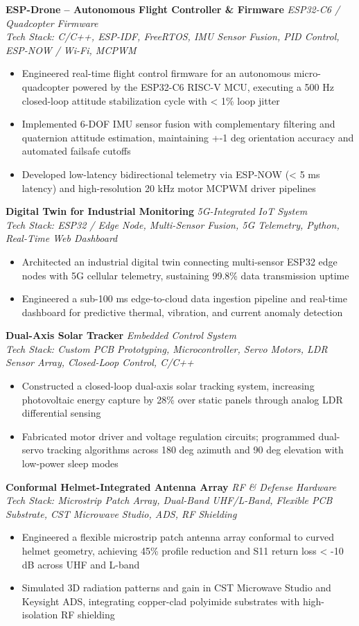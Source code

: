 \documentclass[a4paper,10pt]{article}
\newcommand{\resumeItem}[1]{\item #1}
\newenvironment{resumeItemize}{\begin{itemize}[leftmargin=*, itemsep=0.5pt, topsep=0.8pt]}{\end{itemize}}
\newcommand{\resumeProject}[3]{
  \textbf{#1} \hfill \textit{#2} \\
  \textit{Tech Stack: #3}
}
\begin{document}
\resumeProject{ESP-Drone -- Autonomous Flight Controller \& Firmware}{ESP32-C6 / Quadcopter Firmware}{C/C++, ESP-IDF, FreeRTOS, IMU Sensor Fusion, PID Control, ESP-NOW / Wi-Fi, MCPWM}
\begin{resumeItemize}
    \resumeItem{Engineered real-time flight control firmware for an autonomous micro-quadcopter powered by the ESP32-C6 RISC-V MCU, executing a 500 Hz closed-loop attitude stabilization cycle with < 1\% loop jitter}
    \resumeItem{Implemented 6-DOF IMU sensor fusion with complementary filtering and quaternion attitude estimation, maintaining +-1 deg orientation accuracy and automated failsafe cutoffs}
    \resumeItem{Developed low-latency bidirectional telemetry via ESP-NOW (< 5 ms latency) and high-resolution 20 kHz motor MCPWM driver pipelines}
\end{resumeItemize}
\vspace{1.6pt}

\resumeProject{Digital Twin for Industrial Monitoring}{5G-Integrated IoT System}{ESP32 / Edge Node, Multi-Sensor Fusion, 5G Telemetry, Python, Real-Time Web Dashboard}
\begin{resumeItemize}
    \resumeItem{Architected an industrial digital twin connecting multi-sensor ESP32 edge nodes with 5G cellular telemetry, sustaining 99.8\% data transmission uptime}
    \resumeItem{Engineered a sub-100 ms edge-to-cloud data ingestion pipeline and real-time dashboard for predictive thermal, vibration, and current anomaly detection}
\end{resumeItemize}
\vspace{1.6pt}

\resumeProject{Dual-Axis Solar Tracker}{Embedded Control System}{Custom PCB Prototyping, Microcontroller, Servo Motors, LDR Sensor Array, Closed-Loop Control, C/C++}
\begin{resumeItemize}
    \resumeItem{Constructed a closed-loop dual-axis solar tracking system, increasing photovoltaic energy capture by 28\% over static panels through analog LDR differential sensing}
    \resumeItem{Fabricated motor driver and voltage regulation circuits; programmed dual-servo tracking algorithms across 180 deg azimuth and 90 deg elevation with low-power sleep modes}
\end{resumeItemize}
\vspace{1.6pt}

\resumeProject{Conformal Helmet-Integrated Antenna Array}{RF \& Defense Hardware}{Microstrip Patch Array, Dual-Band UHF/L-Band, Flexible PCB Substrate, CST Microwave Studio, ADS, RF Shielding}
\begin{resumeItemize}
    \resumeItem{Engineered a flexible microstrip patch antenna array conformal to curved helmet geometry, achieving 45\% profile reduction and S11 return loss < -10 dB across UHF and L-band}
    \resumeItem{Simulated 3D radiation patterns and gain in CST Microwave Studio and Keysight ADS, integrating copper-clad polyimide substrates with high-isolation RF shielding}
\end{resumeItemize}
\vspace{1.6pt}
\end{document}
